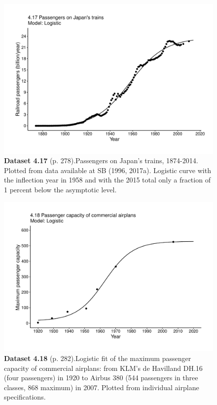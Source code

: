 \documentclass[aps,rmp,preprint,superscriptaddress,10pt,onecolumn]{article}
\begin{document}
\clearpage
\begin{figure}[h]
\includegraphics[width=\textwidth]{output/figs-ggplot/4.17.pdf}
\caption*{\textbf{Dataset 4.17} (p. 278).Passengers on Japan's trains, 1874-2014. Plotted from data available at SB (1996, 2017a). Logistic curve with the inflection year in 1958 and with the 2015 total only a fraction of 1 percent below the asymptotic level.}
\end{figure}
	
\clearpage
\begin{figure}[h]
\includegraphics[width=\textwidth]{output/figs-ggplot/4.18.pdf}
\caption*{\textbf{Dataset 4.18} (p. 282).Logistic fit of the maximum passenger capacity of commercial airplans: from KLM's de Havilland DH.16 (four passengers) in 1920 to Airbus 380 (544 passengers in three classes, 868 maximum) in 2007. Plotted from individual airplane specifications.}
\end{figure}
	
\end{document}
